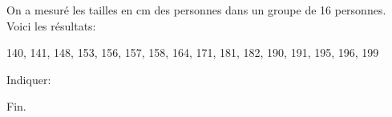 \documentclass[a4paper,12pt]{scrartcl}
\begin{document}
\clearpage
{}

On a mesuré les tailles en cm des personnes dans un groupe de 16 personnes. Voici les résultats:

140, 141, 148, 153, 156, 157, 158, 164, 171, 181, 182, 190, 191, 195, 196, 199

Indiquer:







\trait

\begin{center}
Fin.
\end{center}
\end{document}
